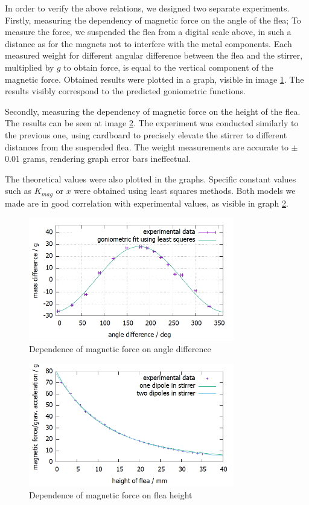 \documentclass[10pt,a4paper]{article}
\begin{document}
In order to verify the above relations, we designed two separate experiments. Firstly, measuring the dependency of magnetic force on the angle of the flea; To measure the force, we suspended the flea from a digital scale above, in such a distance as for the magnets not to interfere with the metal components. Each measured weight for different angular difference between the flea and the stirrer, multiplied by $g$ to obtain force, is equal to the vertical component of the magnetic force. Obtained results were plotted in a graph, visible in image \ref{obr:uhel}. The results visibly correspond to the predicted goniometric functions. \par Secondly, measuring the dependency of magnetic force on the height of the flea. The results can be seen at image \ref{obr:vyska}. The experiment was conducted similarly to the previous one, using cardboard to precisely elevate the stirrer to different distances from the suspended flea. The weight measurements are accurate to $\pm $ 0.01 grams, rendering graph error bars ineffectual. \par The theoretical values were also plotted in the graphs. Specific constant values such as $ K_{mag} $ or $ x $ were obtained using least squares methods. Both models we made are in good correlation with experimental values, as visible in graph \ref{obr:vyska}.

\begin{figure}[H]
  \centering
  \includegraphics[width=0.8\textwidth]{Oleguv_graf.png}
  \caption{Dependence of magnetic force on angle difference}
  \label{obr:uhel}
\end{figure}

\begin{figure}[H]
  \centering
  \includegraphics[width=0.8\textwidth]{blecha_sila-vyska.png}
  \caption{Dependence of magnetic force on flea height}
  \label{obr:vyska}
\end{figure}
\end{document}
